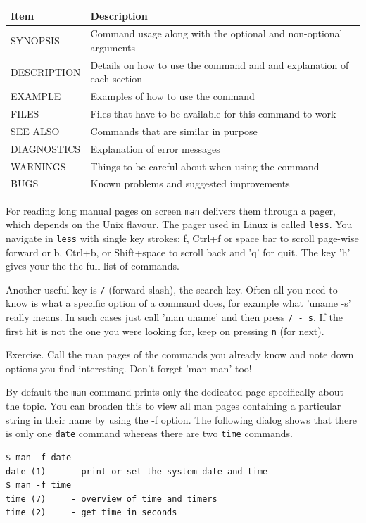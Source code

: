 \documentclass[11pt,a4paper,twoside]{article}
\begin{document}
\begin{center}
\begin{tabular}{ l | l }
\hline
Item & Description \\
\hline
SYNOPSIS & Command usage along with the optional and non-optional arguments \\
DESCRIPTION & Details on how to use the command and and explanation of each
section \\
EXAMPLE & Examples of how to use the command \\
FILES & Files that have to be available for this command to work \\
SEE ALSO & Commands that are similar in purpose \\
DIAGNOSTICS & Explanation of error messages \\
WARNINGS & Things to be careful about when using the command \\
BUGS & Known problems and suggested improvements \\
\hline
\end{tabular}
\end{center}

For reading long manual pages on screen \texttt{man} delivers them
through a pager, which depends on the Unix flavour. The pager used in
Linux is called \texttt{less}. You navigate in \texttt{less} with single 
key strokes: f, Ctrl+f or space bar to scroll page-wise forward or b, 
Ctrl+b, or Shift+space to scroll back and 'q' for quit. The key 'h' gives 
your the the full list of commands.

Another useful key is \texttt{/} (forward slash), the search key. Often
all you need to know is what a specific option of a command does, for
example what 'uname -s' really means. In such cases just call 'man uname'
and then press \texttt{/ - s}. If the first hit is not the one you were looking
for, keep on pressing \texttt{n} (for next).

Exercise. Call the man pages of the commands you already know and note
down options you find interesting. Don't forget 'man man' too!

By default the \texttt{man} command prints only the dedicated page
specifically about the topic. You can broaden this to view all man pages
containing a particular string in their name by using the -f option. 
The following dialog shows that there is only one \texttt{date} command
whereas there are two \texttt{time} commands.

\begin{lstlisting}[frame=single]
$ man -f date
date (1)     - print or set the system date and time
$ man -f time
time (7)     - overview of time and timers
time (2)     - get time in seconds
\end{lstlisting}
\end{document}
